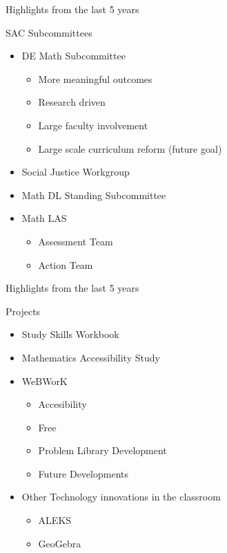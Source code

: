 \documentclass{beamer}
\begin{document}
\begin{frame}{Highlights from the last 5 years}
\begin{block}{SAC Subcommittees}
\begin{itemize}

 \item DE Math Subcommittee
	\begin{itemize}
	\item More meaningful outcomes
	\item Research driven
	\item Large faculty involvement
	 \item Large scale curriculum reform (future goal)
	\end{itemize}
 \item Social Justice Workgroup
 \item Math DL Standing Subcommittee
\item Math LAS
	\begin{itemize}
	 \item Assessment Team
	 \item Action Team
\end{itemize}


 
\end{itemize}
\end{block}
\end{frame}


\begin{frame}{Highlights from the last 5 years}
\begin{block}{Projects}
\begin{itemize}
 \item Study Skills Workbook
 \item Mathematics Accessibility Study

 \item WeBWorK
	\begin{itemize}
	 \item Accesibility
	 \item Free
	 \item Problem Library Development
	 \item Future Developments
	\end{itemize}

 \item Other Technology innovations in the classroom
	\begin{itemize}
	 \item ALEKS
	 \item GeoGebra
	\end{itemize}

\end{itemize}
\end{block}
\end{frame}
\end{document}
